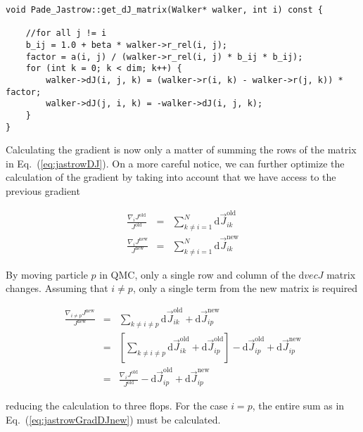 \begin{lstlisting}
void Pade_Jastrow::get_dJ_matrix(Walker* walker, int i) const {
    
    //for all j != i
    b_ij = 1.0 + beta * walker->r_rel(i, j);
    factor = a(i, j) / (walker->r_rel(i, j) * b_ij * b_ij);
    for (int k = 0; k < dim; k++) {
        walker->dJ(i, j, k) = (walker->r(i, k) - walker->r(j, k)) * factor;
        walker->dJ(j, i, k) = -walker->dJ(i, j, k);
    }
}
\end{lstlisting}


Calculating the gradient is now only a matter of summing the rows of the matrix in Eq.~(\ref{eq:jastrowDJ}). On a more careful notice, we can further optimize the calculation of the gradient by taking into account that we have access to the previous gradient

\begin{eqnarray}
  \frac{\nabla_i J^\mathrm{old}}{J^\mathrm{old}} &=& \sum_{k \ne i = 1}^N \mathrm{d}\vec J^\mathrm{old}_{ik} \\
  \frac{\nabla_i J^\mathrm{new}}{J^\mathrm{new}} &=& \sum_{k \ne i = 1}^N \mathrm{d}\vec J^\mathrm{new}_{ik} \label{eq:jastrowGradDJnew}
\end{eqnarray}

By moving particle $p$ in QMC, only a single row and column of the $\mathrm{d}vec J$ matrix changes. Assuming that $i\ne p$, only a single term from the new matrix is required

\begin{eqnarray}
 \frac{\nabla_{i\ne p} J^\mathrm{new}}{J^\mathrm{new}} &=& \sum_{k \ne i \ne p} \mathrm{d}\vec J^\mathrm{old}_{ik} + \mathrm{d}\vec J^\mathrm{new}_{ip} \\
 &=& \left[\sum_{k \ne i \ne p} \mathrm{d}\vec J^\mathrm{old}_{ik} + \mathrm{d}\vec J^\mathrm{old}_{ip}\right] - \mathrm{d}\vec J^\mathrm{old}_{ip} + \mathrm{d}\vec J^\mathrm{new}_{ip} \\
 &=& \frac{\nabla_i J^\mathrm{old}}{J^\mathrm{old}} - \mathrm{d}\vec J^\mathrm{old}_{ip} + \mathrm{d}\vec J^\mathrm{new}_{ip}
\end{eqnarray}

reducing the calculation to three flops. For the case $i=p$, the entire sum as in Eq.~(\ref{eq:jastrowGradDJnew}) must be calculated. 

